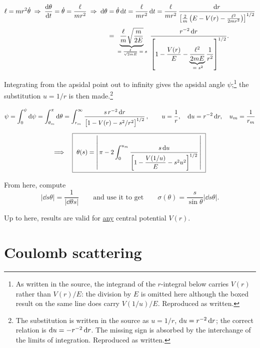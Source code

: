 \documentclass[11pt]{article}
\begin{document}
\begin{align*}
\ell = m r^{2}\dot\theta \;\Rightarrow\;
\frac{\mathrm{d} \theta}{\mathrm{d} t} = \dot\theta = \frac{\ell}{mr^{2}}
\;\Rightarrow\;
\mathrm{d}\theta &= \dot\theta\,\mathrm{d} t = \frac{\ell}{mr^{2}}\,\mathrm{d} t
 = \frac{\ell}{mr^{2}}\,
   \frac{\mathrm{d} r}{\left[\frac{2}{m}\left(E-V(r)-\frac{\ell^{2}}{2mr^{2}}\right)\right]^{1/2}}\\[4pt]
 &= \underbrace{\frac{\ell}{m}\sqrt{\frac{m}{2E}}}_{\;=\;\frac{\ell}{\sqrt{2mE}}\;=\;s}\;
    \frac{r^{-2}\,\mathrm{d} r}{\left[1 - \dfrac{V(r)}{E}
      - \underbrace{\dfrac{\ell^{2}}{2mE}}_{\;=\;s^{2}}\dfrac{1}{r^{2}}\right]^{1/2}} .
\end{align*}

Integrating from the apsidal point out to infinity gives the apsidal angle
$\psi$;\footnote{As written in the source, the integrand of the $r$-integral below
carries $V(r)$ rather than $V(r)/E$: the division by $E$ is omitted here although
the boxed result on the same line does carry $V(1/u)/E$. Reproduced as written.}
the substitution $u = 1/r$ is then made.\footnote{The substitution is written in the
source as $u = 1/r$, $\mathrm{d} u = r^{-2}\,\mathrm{d} r$; the correct relation is
$\mathrm{d} u = -r^{-2}\,\mathrm{d} r$. The missing sign is absorbed by the interchange of the
limits of integration. Reproduced as written.}

\begin{gather*}
\psi = \int_{0}^{\psi}\mathrm{d}\psi = \int_{\theta_{m}}^{\pi}\mathrm{d}\theta
     = \int_{r_{m}}^{\infty} \frac{s\,r^{-2}\,\mathrm{d} r}
       {\bigl[1 - V(r) - s^{2}/r^{2}\bigr]^{1/2}}\,,
\qquad
u = \frac{1}{r},\quad \mathrm{d} u = r^{-2}\,\mathrm{d} r,\quad u_{m} = \frac{1}{r_{m}}\\[6pt]
\Longrightarrow\quad
\boxed{\ \theta(s) = \left\lvert\, \pi - 2\int_{0}^{u_{m}}
  \frac{s\,\mathrm{d} u}{\left[1 - \dfrac{V(1/u)}{E} - s^{2}u^{2}\right]^{1/2}} \,\right\rvert\ }
\end{gather*}

From here, compute
\[
\left\lvert \dd{s}{\theta}\right\rvert = \frac{1}{\left\lvert \dd{\theta}{s}\right\rvert}
\qquad\text{and use it to get}\qquad
\sigma(\theta) = \frac{s}{\sin\theta}\left\lvert \dd{s}{\theta}\right\rvert .
\]

\begin{caveat}
Up to here, results are valid for \underline{any} central potential $V(r)$.
\end{caveat}

\section*{Coulomb scattering}
\end{document}
